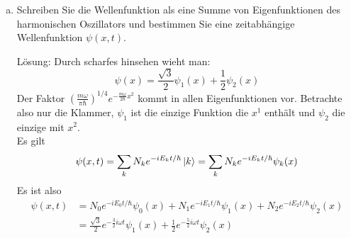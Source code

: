 \documentclass{scrartcl}
\begin{document}
\begin{enumerate}[a)]
\item Schreiben Sie die Wellenfunktion als eine Summe von Eigenfunktionen des harmonischen Oszillators und bestimmen Sie eine zeitabhängige Wellenfunktion $\psi(x,t)$.
\item[Lösung:]
Durch scharfes hinsehen wieht man:
\[\psi(x)=\frac{\sqrt 3}{2}\psi_1(x)+\frac{1}{2}\psi_2(x)\]
Der Faktor $\left(\frac{m\omega}{\pi\hbar}\right)^{1/4}e^{-\frac{m\omega}{2\hbar}x^2}$ kommt in allen Eigenfunktionen vor. Betrachte also nur die Klammer, $\psi_1$ ist die einzige Funktion die $x^1$ enthält und $\psi_2$ die einzige mit $x^2$.\\
Es gilt
\[\psi(x,t)=\sum_k N_k e^{-iE_k t/\hbar}\ket{k}=\sum_k N_k e^{-iE_k t /\hbar}\psi_k(x)\]
Es ist also
\begin{align*}
\psi(x,t)	&=N_0 e^{-iE_0 t/\hbar}\psi_0(x) + N_1 e^{-iE_1 t/\hbar}\psi_1(x) + N_2 e^{-iE_2 t/\hbar}\psi_2(x) \\
&= \frac{\sqrt 3}{2} e^{-\frac{3}{2}i\omega t}\psi_1(x) + \frac{1}{2} e^{-\frac{5}{2}i\omega t}\psi_2(x) \\
\end{align*}


\end{enumerate}
\end{document}
